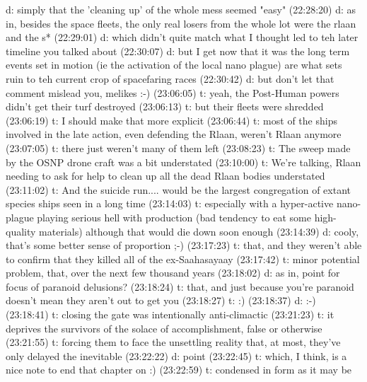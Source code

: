 d: simply that the 'cleaning up' of the whole mess seemed "easy"
(22:28:20) d: as in, besides the space fleets, the only real losers from the whole lot were the rlaan and the s*
(22:29:01) d: which didn't quite match what I thought led to teh later timeline you talked about
(22:30:07) d: but I get now that it was the long term events set in motion (ie the activation of the local nano plague) are what sets ruin to teh current crop of spacefaring races 
(22:30:42) d: but don't let that comment mislead you, melikes :-)
(23:06:05) t: yeah, the Post-Human powers didn't get their turf destroyed
(23:06:13) t: but their fleets were shredded
(23:06:19) t: I should make that more explicit
(23:06:44) t: most of the ships involved in the late action, even defending the Rlaan, weren't Rlaan anymore 
(23:07:05) t: there just weren't many of them left
(23:08:23) t: The sweep made by the OSNP drone craft was a bit understated
(23:10:00) t: We're talking, Rlaan needing to ask for help to clean up all the dead Rlaan bodies understated
(23:11:02) t: And the suicide run.... would be the largest congregation of extant species ships seen in a long time
(23:14:03) t: especially with a hyper-active nano-plague playing serious hell with production (bad tendency to eat some high-quality materials) although that would die down soon enough 
(23:14:39) d: cooly, that's some better sense of proportion ;-)
(23:17:23) t: that, and they weren't able to confirm that they killed all of the ex-Saahasayaay
(23:17:42) t: minor potential problem, that, over the next few thousand years
(23:18:02) d: as in, point for focus of paranoid delusions?
(23:18:24) t: that, and just because you're paranoid doesn't mean they aren't out to get you
(23:18:27) t: :)
(23:18:37) d: :-)
(23:18:41) t: closing the gate was intentionally anti-climactic
(23:21:23) t: it deprives the survivors of the solace of accomplishment, false or otherwise
(23:21:55) t: forcing them to face the unsettling reality that, at most, they've only delayed the inevitable
(23:22:22) d: point
(23:22:45) t: which, I think, is a nice note to end that chapter on :)
(23:22:59) t: condensed in form as it may be

